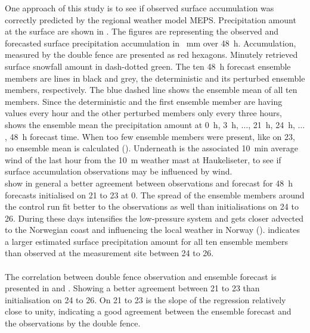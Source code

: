 One approach of this study is to see if observed surface accumulation was correctly predicted by the regional weather model MEPS. Precipitation amount at the surface are shown in . The figures are representing the observed and forecasted surface precipitation accumulation in \SI{}{\mm} over \SI{48}{\hour}. Accumulation, measured by the double fence are presented as red hexagons. Minutely retrieved surface snowfall amount in dash-dotted green. The ten \SI{48}{\hour} forecast ensemble members are lines in black and grey, the deterministic and its perturbed ensemble members, respectively. The blue dashed line shows the ensemble mean of all ten members. Since the deterministic and the first ensemble member are having values every hour and the other perturbed members only every three hours, shows the ensemble mean the precipitation amount at \SI{0}{\hour}, \SI{3}{\hour}, $\ldots$, \SI{21}{\hour}, \SI{24}{\hour}, $\ldots$, \SI{48}{\hour} forecast time. When too few ensemble members were present, like on \SI{23}{\dec}, no ensemble mean is calculated (). 
Underneath is the associated \SI{10}{\minute} average wind of the last hour from the \SI{10}{\metre} weather mast at Haukeliseter, to see if surface accumulation observations may be influenced by wind. 
\\
 show in general a better agreement between observations and forecast for \SI{48}{\hour} forecasts initialised on \num{21} to \SI{23}{\dec} at \SI{0}{\UTC}. The spread of the ensemble members around the control run fit better to the observations as well than initialisations on \num{24} to \SI{26}{\dec}. 
During these days intensifies the low-pressure system and gets closer advected to the Norwegian coast and influencing the local weather in Norway ().  indicates a larger estimated surface precipitation amount for all ten ensemble members than observed at the measurement site between \num{24} to \SI{26}{\dec}. 
\\ 
\\
The correlation between double fence observation and ensemble forecast is presented in  and . Showing a better agreement between \num{21} to \SI{23}{\dec} than initialisation on \num{24} to \SI{26}{\dec}. On \num{21} to \SI{23}{\dec} is the slope of the regression relatively close to unity, indicating a good agreement between the ensemble forecast and the observations by the double fence.
